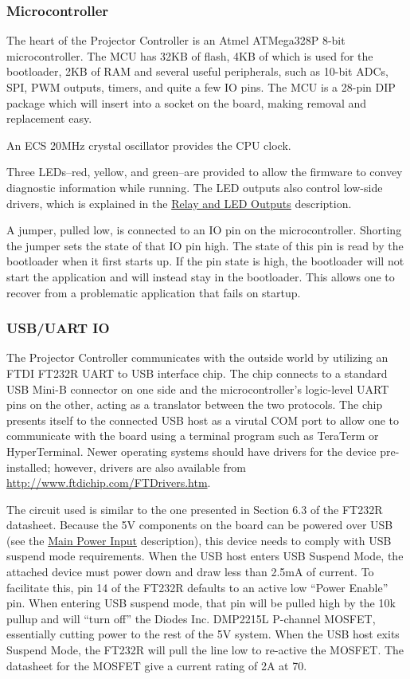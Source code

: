 \documentclass{article}
\begin{document}
\subsubsection{Microcontroller} \label{sssec:Microcontroller}
The heart of the Projector Controller is an Atmel ATMega328P 8-bit microcontroller.  The MCU has
32KB of flash, 4KB of which is used for the bootloader, 2KB of RAM and several useful peripherals,
such as 10-bit ADCs, SPI, PWM outputs, timers, and quite a few IO pins.  The MCU is a 28-pin DIP
package which will insert into a socket on the board, making removal and replacement easy.

An ECS 20MHz crystal oscillator provides the CPU clock.

Three LEDs--red, yellow, and green--are provided to allow the firmware to convey diagnostic
information while running.  The LED outputs also control low-side drivers, which is explained in the
\hyperref[sssec:RelayLED]{Relay and LED Outputs} description.

A jumper, pulled low, is connected to an IO pin on the microcontroller.  Shorting the jumper sets
the state of that IO pin high.  The state of this pin is read by the bootloader when it first starts
up.  If the pin state is high, the bootloader will not start the application and will instead stay
in the bootloader.  This allows one to recover from a problematic application that fails on startup.

\subsubsection{USB/UART IO} \label{sssec:USBUART}
The Projector Controller communicates with the outside world by utilizing an FTDI FT232R UART to
USB interface chip.  The chip connects to a standard USB Mini-B connector on one side and the
microcontroller's logic-level UART pins on the other, acting as a translator between the two
protocols.  The chip presents itself to the connected USB host as a virutal COM port to
allow one to communicate with the board using a terminal program such as TeraTerm or HyperTerminal.
Newer operating systems should have drivers for the device pre-installed; however, drivers are also
available from \url{http://www.ftdichip.com/FTDrivers.htm}.

The circuit used is similar to the one presented in Section 6.3 of the FT232R datasheet.  Because
the 5V components on the board can be powered over USB (see the \hyperref[sssec:MainPower]{Main
  Power Input} description), this device needs to comply with USB suspend mode requirements.  When
the USB host enters USB Suspend Mode, the attached device must power down and draw less than 2.5mA
of current.  To facilitate this, pin 14 of the FT232R defaults to an active low ``Power Enable'' pin.
When entering USB suspend mode, that pin will be pulled high by the 10k\textOmega{} pullup and will
``turn off'' the Diodes Inc. DMP2215L P-channel MOSFET, essentially cutting power to the rest of the
5V system.  When the USB host exits Suspend Mode, the FT232R will pull the line low to re-active the
MOSFET.  The datasheet for the MOSFET give a current rating of 2A at 70\textcelsius{}.
\end{document}
